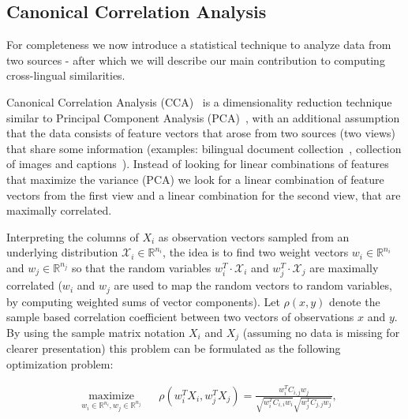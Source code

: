 \documentclass[twoside,11pt]{article}
\newcommand{\RR}{\mathbb{R}}
\begin{document}
\subsection{Canonical Correlation Analysis}
 For completeness we now introduce a statistical technique to analyze data from two sources - after which we will describe our main contribution to computing cross-lingual similarities.

 Canonical Correlation Analysis (CCA)~\cite{Hotelling} is a dimensionality reduction technique similar to Principal Component Analysis (PCA)~\cite{Pearson1901On}, with an additional assumption that the data consists of feature vectors that arose from two sources (two views) that share some information (examples: bilingual document collection~\cite{mrpqr}, collection of images and captions~\cite{HardoonSS04}). Instead of looking for linear combinations of features that maximize the variance (PCA) we look for a linear combination of feature vectors from the first view and a linear combination for the second view, that are maximally correlated.

Interpreting the columns of $X_i$ as observation vectors sampled from an underlying distribution $\mathcal{X}_i \in \RR^{n_i}$, the idea is to find two weight vectors $w_i \in \RR^{n_i}$ and $w_j \in \RR^{n_j}$ so that the random variables $w_i^T \cdot \mathcal{X}_i$ and $w_j^T \cdot \mathcal{X}_j$ are maximally correlated ($w_i$ and $w_j$ are used to map the random vectors to random variables, by computing weighted sums of vector components). Let $\rho(x,y)$ denote the sample based correlation coefficient between two vectors of observations $x$ and $y$. By using the sample matrix notation $X_i$ and $X_j$ (assuming no data is missing for clearer presentation) this problem can be formulated as the following optimization problem:

\begin{equation*}
\begin{aligned}
& \underset{w_i \in \RR^{n_i}, w_j \in \RR^{n_j}}{\text{maximize}}
& & \rho(w_i^T X_i , w_j^T X_j) = \frac{w_i^T C_{i,j} w_j}{\sqrt{w_i^T C_{i,i} w_i} \sqrt{w_j^T C_{j,j} w_j}},
\end{aligned}
\end{equation*}
\end{document}
